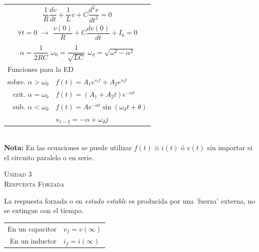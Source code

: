 \documentclass[11pt,a4paper,twocolumn]{article}
\newcommand{\unidad}[2]{\begin{center}
		\fontsize{10}{10}\selectfont\color{gray!50!black}\scshape Unidad #1 \\
		\fontsize{14}{14}\selectfont \scshape #2
\end{center} \vspace{-.6cm}}
\begin{document}
\begin{tcolorbox}[colback=white!97!brown, colframe=brown!15!gray]
\begin{tabular}{r l}
			\multicolumn{2}{c}{$\dfrac{1}{R}\dfrac{dv}{dt}+\dfrac{1}{L} v +C\dfrac{d^2 v}{dt^2}=0 $} \vspace{.2cm} \\ 
			
			
			\multicolumn{2}{c}{$\forall t=0$ $\rightarrow$ $\dfrac{v(0)}{R}+C\dfrac{dv(0)}{dt}+I_{0}=0 $} \vspace{.2cm}\\
			\vspace{-.5cm} & \\  %
			
			\multicolumn{2}{c}{$\alpha=\dfrac{1}{2RC}$ \hspace{.4cm}  $\omega_{0}=\dfrac{1}{\sqrt{LC}}$ \hspace{.4cm}  $\omega_{d}=\sqrt{\omega^{2}-\alpha^{2}}$\vspace{.2cm}} \\ 
			 
			\multicolumn{2}{l}{Funciones para la ED} \\ 
			
		sobre. $\alpha > \omega_{0}$ &$f(t)=A_{1}e^{s_{1}t}+A_{2} e^{s_{2}t}$ \vspace{.1cm}\\
			
		crit. $\alpha = \omega_{0}$&$f(t)=(A_{1}+A_{2}t)e^{-\alpha t}$ \vspace{.1cm}\\
			
		sub. $\alpha < \omega_{0}$ & $f(t)=Ae^{-\alpha t}\sin(\omega_{d}t+\theta)$ \vspace{.1cm}\\
			& $s_{1-2}=-\alpha + \omega_{d}j$\\
		\end{tabular}\\
	
	\textbf{Nota: } En las ecuaciones se puede utilizar $f(t)\equiv i(t)$ ó $v(t)$ sin importar si el circuito paralelo o en serie.
	\end{tcolorbox}
	

	
\unidad{3}{Respuesta Forzada}
	
	\begin{tcolorbox}[colback=white!97!brown, colframe=brown!15!gray]
		La respuesta forzada o en \emph{estado estable} es producida por una 'fuerza' externa, no se extingue con el tiempo.
		
		\begin{tabular}{r l}
			En un capacitor & $v_{f}=v(\infty)$ \\
			En un inductor & $i_{f}=i(\infty)$ \\
		\end{tabular}
	\end{tcolorbox}
\end{document}
